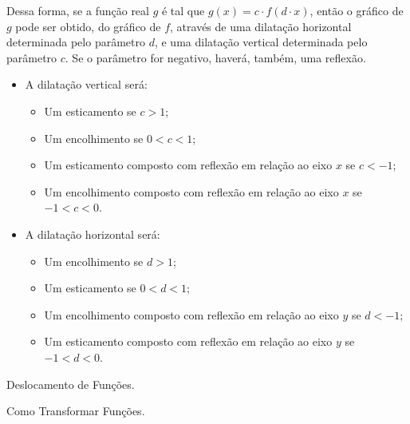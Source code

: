 Dessa forma, se a função real $g$ é tal que $g(x) = c \cdot f(d
\cdot x)$, então o gráfico de $g$ pode ser obtido, do gráfico de
$f$, através de uma dilatação horizontal determinada pelo parâmetro
$d$, e uma dilatação vertical determinada pelo parâmetro $c$. Se o
parâmetro for negativo, haverá, também, uma reflexão.
\begin{itemize}
  \item A dilatação vertical será:
        \begin{itemize}
          \item Um esticamento se $c>1$;
          \item Um encolhimento se $0<c<1$;
          \item Um esticamento composto com reflexão em relação ao eixo $x$ se $c<-1$;
          \item Um encolhimento composto com reflexão em relação ao eixo $x$ se
          $-1<c<0$.
        \end{itemize}
  \item A dilatação horizontal será:
        \begin{itemize}
          \item Um encolhimento se $d>1$;
          \item Um esticamento se $0<d<1$;
          \item Um encolhimento composto com reflexão em relação ao eixo $y$ se $d<-1$;
          \item Um esticamento composto com reflexão em relação ao eixo $y$ se
          $-1<d<0$.
        \end{itemize}
\end{itemize}

\begin{onlineact}
    {Deslocamento de Funções}.
\end{onlineact}

\begin{onlineact}
    {Como Transformar Funções}.
\end{onlineact}